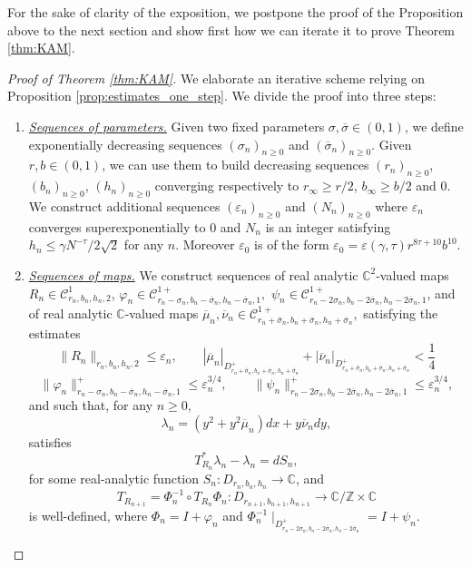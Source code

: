 \documentclass[10pt]{article}
\newcommand{\Z}{\mathbb{Z}}
\newcommand{\C}{\mathbb{C}}
\newcommand{\Domain}[3]{D_{#1, #2, #3}}
\newcommand{\DomainP}[3]{D_{#1, #2, #3}^+}
\begin{document}
For the sake of clarity of the exposition, we postpone the proof of the Proposition above to the next section and show first how we can iterate it to prove  Theorem \ref{thm:KAM}.

\begin{proof}[Proof of Theorem \ref{thm:KAM}]
We elaborate an iterative scheme relying on Proposition \ref{prop:estimates_one_step}. We divide the proof into three steps:
\begin{enumerate}
    \item {\it\underline{Sequences of parameters.}} Given two fixed parameters $\sigma,\overline\sigma\in(0,1)$, we define exponentially decreasing sequences
    $(\sigma_n)_{n\geq 0}$ and $(\overline\sigma_n)_{n\geq 0}$. Given $r,b\in(0,1)$, we can use them to build decreasing sequences
    $(r_n)_{n\geq 0}$, $(b_n)_{n\geq 0}$, $(h_n)_{n\geq 0}$ converging respectively to $r_\infty\geq r/2$, $b_\infty\geq b/2$ and $0$. 
    We construct additional sequences $(\varepsilon_n)_{n\geq 0}$ and $(N_n)_{n\geq 0}$  where $\varepsilon_n$ converges superexponentially to $0$ and $N_n$ is an integer satisfying $h_n\leq \gamma N^{-\tau}/2\sqrt 2$ for any $n$. Moreover $\varepsilon_0$ is of the form $\varepsilon_0 = \varepsilon(\gamma,\tau)r^{8\tau+10}b^{10}$.
    \item {\it\underline{Sequences of maps.}}  We construct sequences of real analytic $\C^2$-valued maps $R_n\in\mathscr C^1_{r_n,b_n,h_n,2}$, $\varphi_n\in\mathscr C^{1+}_{r_n-\sigma_n,b_n-\overline\sigma_n,h_n-\overline\sigma_n, 1},$ $\psi_n\in\mathscr C^{1+}_{r_n-2\sigma_n,b_n-2\overline\sigma_n,h_n-2\overline\sigma_n, 1}$, and of real analytic $\C$-valued maps $\overline \mu_n, \overline \nu_n \in  \mathscr C^{1+}_{r_n + \overline \sigma_n,b_n + \overline \sigma_n,h_n + \overline \sigma_n},$ satisfying the estimates
   \[  \|R_n\|_{r_n, b_n, h_n, 2} \leq \varepsilon_n, \qquad |\overline \mu_n|_{\DomainP{r_n + \overline \sigma_n}{b_n + \overline \sigma_n}{h_n + \overline \sigma_n}} + |\overline \nu_n|_{\DomainP{r_n + \overline \sigma_n}{b_n + \overline \sigma_n}{h_n + \overline \sigma_n}} < \frac{1}{4} \]
   \[\|\varphi_n\|^+_{r_n - \sigma_n, b_n - \overline \sigma_n, h_n - \overline \sigma_n, 1} \leq \varepsilon_n^{3/4},\qquad  \|\psi_n\|^+_{r_n - 2\sigma_n, b_n - 2\overline \sigma_n, h_n - 2\overline \sigma_n, 1}\leq \varepsilon_n^{3/4},\]
   and such that, for any $ n \geq 0$,
 \[ \lambda_{n} = (y^2 + y^2 \overline \mu_{n})dx + y \overline \nu_{n}dy,\]
 satisfies
    \[ 
    T_{R_{n}}^* \lambda_{n} - \lambda_{n} = d S_{n},
    \]
        for some real-analytic function $S_{n}: \Domain{r_n}{b_n}{h_n} \to \C$, and
    \[
    T_{R_{n+1}} = \Phi_n^{-1}\circ T_{R_n}\Phi_n : \Domain{r_{n + 1}}{b_{n + 1}}{h_{n + 1}}  \to \C/\Z \times \C
    \]
    is well-defined, where $\Phi_n = I+\varphi_n$ and $\Phi_n^{-1}\mid_{\DomainP{r_n-2\sigma_n}{b_n-2\overline\sigma_n}{h_n-2\overline\sigma_n}} = I+\psi_n$.    
    

\end{enumerate}
\end{proof}
\end{document}
